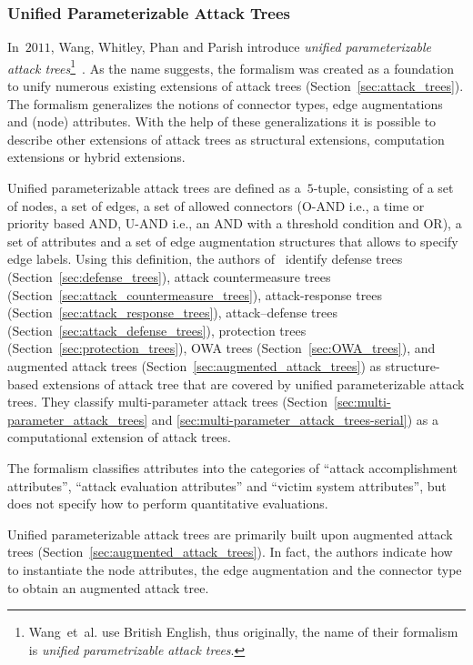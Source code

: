 \documentclass[a4paper]{article}
\begin{document}
\subsubsection{Unified Parameterizable Attack Trees} 
\label{sec:unified_parametrizable_attack_trees}

In~$2011$, Wang, Whitley, Phan and Parish introduce \emph{unified 
parameterizable attack trees}\footnote{Wang~et~al. use British English, thus
originally, the name of their formalism is \emph{unified parametrizable attack
trees}.}~\cite{WaWhPhPa}. As the name suggests, the formalism was created as a
foundation to unify numerous existing extensions of attack trees
(Section~\ref{sec:attack_trees}). The formalism generalizes the notions of
connector types, edge augmentations and (node) attributes. With the help of
these generalizations it is possible to describe other extensions of attack
trees as structural extensions, computation extensions or hybrid extensions.

Unified parameterizable attack trees are defined as a~$5$-tuple, consisting of 
a set of nodes, a set of edges,  a set of allowed connectors (O-AND i.e., a time
or priority based AND, U-AND  i.e., an AND with a threshold condition and OR), a
set of attributes and a set  of edge augmentation structures that allows to
specify edge labels. Using this  definition, the authors of~\cite{WaWhPhPa}
identify defense trees (Section~\ref{sec:defense_trees}), attack countermeasure
trees (Section~\ref{sec:attack_countermeasure_trees}), attack-response trees
(Section~\ref{sec:attack_response_trees}), attack--defense trees
(Section~\ref{sec:attack_defense_trees}), protection trees
(Section~\ref{sec:protection_trees}), OWA trees (Section~\ref{sec:OWA_trees}),
and augmented attack trees (Section~\ref{sec:augmented_attack_trees}) as
structure-based extensions of attack tree that are covered by unified
parameterizable attack trees. They  classify multi-parameter attack  trees
(Section~\ref{sec:multi-parameter_attack_trees} and 
\ref{sec:multi-parameter_attack_trees-serial}) as a computational extension of
attack trees.

The formalism classifies attributes into the categories of ``attack
accomplishment attributes'', ``attack evaluation attributes'' and ``victim
system attributes'', but does not specify how to perform quantitative
evaluations.

Unified parameterizable attack trees are primarily built upon augmented attack 
trees (Section~\ref{sec:augmented_attack_trees}). In fact, the authors indicate
how to instantiate the node attributes, the edge augmentation and the connector 
type to obtain an augmented attack tree.
\end{document}
